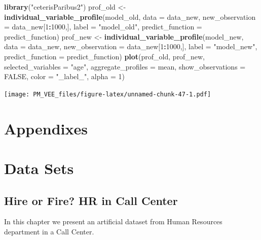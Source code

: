 \documentclass[]{krantz}
\newenvironment{Shaded}{\begin{snugshade}}{\end{snugshade}}
\newcommand{\DataTypeTok}[1]{\textcolor[rgb]{0.13,0.29,0.53}{#1}}
\newcommand{\DecValTok}[1]{\textcolor[rgb]{0.00,0.00,0.81}{#1}}
\newcommand{\KeywordTok}[1]{\textcolor[rgb]{0.13,0.29,0.53}{\textbf{#1}}}
\newcommand{\NormalTok}[1]{#1}
\newcommand{\OperatorTok}[1]{\textcolor[rgb]{0.81,0.36,0.00}{\textbf{#1}}}
\newcommand{\OtherTok}[1]{\textcolor[rgb]{0.56,0.35,0.01}{#1}}
\newcommand{\StringTok}[1]{\textcolor[rgb]{0.31,0.60,0.02}{#1}}
\theoremstyle{definition}
\theoremstyle{definition}
\theoremstyle{definition}
\theoremstyle{remark}
\begin{document}
\begin{Shaded}
\begin{Highlighting}[]
\KeywordTok{library}\NormalTok{(}\StringTok{"ceterisParibus2"}\NormalTok{)}
\NormalTok{prof_old <-}\StringTok{ }\KeywordTok{individual_variable_profile}\NormalTok{(model_old,}
                 \DataTypeTok{data =}\NormalTok{ data_new,}
                 \DataTypeTok{new_observation =}\NormalTok{ data_new[}\DecValTok{1}\OperatorTok{:}\DecValTok{1000}\NormalTok{,],}
                 \DataTypeTok{label =} \StringTok{"model_old"}\NormalTok{,}
                 \DataTypeTok{predict_function =}\NormalTok{ predict_function)}
\NormalTok{prof_new <-}\StringTok{ }\KeywordTok{individual_variable_profile}\NormalTok{(model_new,}
                 \DataTypeTok{data =}\NormalTok{ data_new,}
                 \DataTypeTok{new_observation =}\NormalTok{ data_new[}\DecValTok{1}\OperatorTok{:}\DecValTok{1000}\NormalTok{,],}
                 \DataTypeTok{label =} \StringTok{"model_new"}\NormalTok{,}
                 \DataTypeTok{predict_function =}\NormalTok{ predict_function)}
\KeywordTok{plot}\NormalTok{(prof_old, prof_new,}
     \DataTypeTok{selected_variables =} \StringTok{"age"}\NormalTok{, }\DataTypeTok{aggregate_profiles =}\NormalTok{ mean,}
     \DataTypeTok{show_observations =} \OtherTok{FALSE}\NormalTok{, }\DataTypeTok{color =} \StringTok{"_label_"}\NormalTok{, }\DataTypeTok{alpha =} \DecValTok{1}\NormalTok{)}
\end{Highlighting}
\end{Shaded}

\texttt{[image: PM\_VEE\_files/figure-latex/unnamed-chunk-47-1.pdf]}

\hypertarget{appendixes}{%
\section*{Appendixes}\label{appendixes}}

\hypertarget{DataSets}{%
\section{Data Sets}\label{DataSets}}

\hypertarget{HRdataset}{%
\subsection{Hire or Fire? HR in Call Center}\label{HRdataset}}

In this chapter we present an artificial dataset from Human Resources
department in a Call Center.
\end{document}
